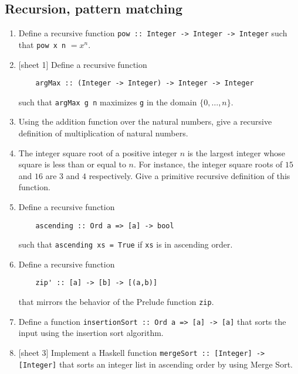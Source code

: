 \documentclass{article}
\begin{document}
\subsection{Recursion, pattern matching}
\begin{enumerate}
\item Define a recursive function \verb|pow :: Integer -> Integer -> Integer| such that \verb|pow x n| $= x^n$.

\item {[sheet 1]} Define a recursive function
\begin{verbatim}
    argMax :: (Integer -> Integer) -> Integer -> Integer
\end{verbatim}
such that \verb|argMax g n| maximizes \verb|g| in the domain $\{0,\dots,n\}$.

\item \cite[p. 86]{thompson} Using the addition function over the natural numbers, give a recursive definition of multiplication of natural numbers.

\item \cite[p. 86]{thompson} The integer square root of a positive integer $n$ is the largest integer whose square is less than or equal to $n$. For instance, the integer square roots of $15$ and $16$ are $3$ and $4$ respectively. Give a primitive recursive definition of this function.

\item Define a recursive function
\begin{verbatim}
    ascending :: Ord a => [a] -> bool
\end{verbatim}
such that \verb|ascending xs = True| if \verb|xs| is in ascending order.

\item Define a recursive function
\begin{verbatim}
    zip' :: [a] -> [b] -> [(a,b)]
\end{verbatim}
that mirrors the behavior of the Prelude function \verb|zip|.

\item Define a function \verb|insertionSort :: Ord a => [a] -> [a]| that sorts the input using the insertion sort algorithm.

\item {[sheet 3]} Implement a Haskell function \verb|mergeSort :: [Integer] -> [Integer]| that sorts an integer list in ascending order by using Merge Sort.


\end{enumerate}
\end{document}

